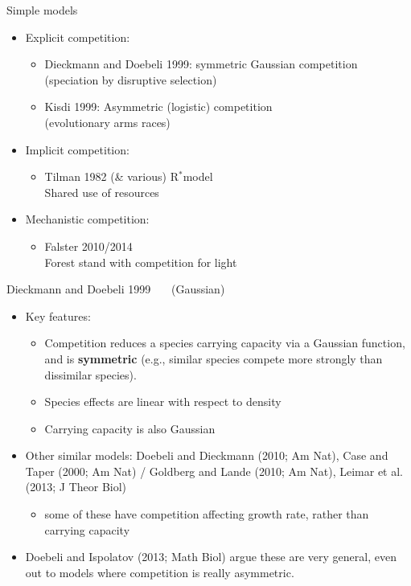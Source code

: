 \documentclass[12pt]{beamer}
\newcommand{\Rstar}{R$^*$}
\newcommand{\subt}[1]{{~~~\normalsize (#1)}}
\begin{document}
\begin{frame}[t]{Simple models}
  \begin{itemize}
  \item Explicit competition:
      \begin{itemize}
      \item Dieckmann and Doebeli 1999: symmetric Gaussian competition\\
        (speciation by disruptive selection)
      \item Kisdi 1999: Asymmetric (logistic) competition\\
        (evolutionary arms races)
      \end{itemize}
  \item Implicit competition:
      \begin{itemize}
      \item Tilman 1982 (\& various) \Rstar model\\
        Shared use of resources
      \end{itemize}
  \item Mechanistic competition:
    \begin{itemize}
    \item Falster 2010/2014\\
      Forest stand with competition for light
    \end{itemize}
  \end{itemize}
\end{frame}

\begin{frame}[t]{Dieckmann and Doebeli 1999 \subt{Gaussian}}
  \begin{itemize}
    \item Key features:
      \begin{itemize}
      \item Competition reduces a species carrying capacity via a
        Gaussian function, and is \textbf{symmetric} (e.g., similar
        species compete more strongly than dissimilar species).
      \item Species effects are linear with respect to density
      \item Carrying capacity is also Gaussian
      \end{itemize}
    \item Other similar models: Doebeli and Dieckmann (2010; Am Nat),
      Case and Taper (2000; Am Nat) / Goldberg and Lande (2010; Am
      Nat), Leimar et al. (2013; J Theor Biol)
      \begin{itemize}
      \item some of these have competition affecting growth rate,
        rather than carrying capacity
      \end{itemize}
    \item Doebeli and Ispolatov (2013; Math Biol) argue these are
      very general, even out to models where competition is really
      asymmetric.
  \end{itemize}
\end{frame}
\end{document}
